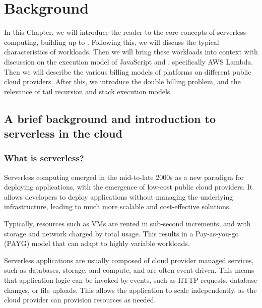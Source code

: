 \chapter{Background}
\label{chap:background}

In this Chapter, we will introduce the reader to the core concepts of serverless computing, building up to \faas{}. Following this, we will discuss the typical characteristics of \faas{} workloads. Then we will bring these workloads into context with discussion on the execution model of JavaScript and \faas{}, specifically AWS Lambda. Then we will describe the various billing models of \faas{} platforms on different public cloud providers. After this, we introduce the double billing problem, and the relevance of tail recursion and stack execution models.

\section{A brief background and introduction to serverless in the cloud}
\subsection{What is serverless?}
Serverless computing emerged in the mid-to-late 2000s\cite{wardleyWardleyMaps2022,IntroducingGoogleApp,patilServerlessComputingEmergence2021} as a new paradigm for deploying applications, with the emergence of low-cost public cloud providers\cite{patilServerlessComputingEmergence2021,BenjaminBlackEC2}. It allows developers to deploy applications without managing the underlying infrastructure, leading to much more scalable and cost-effective solutions.

Typically, resources such as VMs\cite{hoeferTaxonomyCloudComputing2010} are rented in sub-second increments, and with storage and network charged by total usage. This results in a Pay-as-you-go (PAYG) model that can adapt to highly variable workloads\cite{sehgalCostBillingPractices2023,hilleyCloudComputingTaxonomy2009}.

Serverless applications are usually composed of cloud provider managed services, such as databases, storage, and compute, and are often event-driven\cite{EventarcOverview,EventListenerAmazon,robeceOverviewAzureEvent2024}. This means that application logic can be invoked by events, such as HTTP requests, database changes, or file uploads. This allows the application to scale independently\cite{goniwadaCloudNativeArchitecture2022}, as the cloud provider can provision resources as needed.

